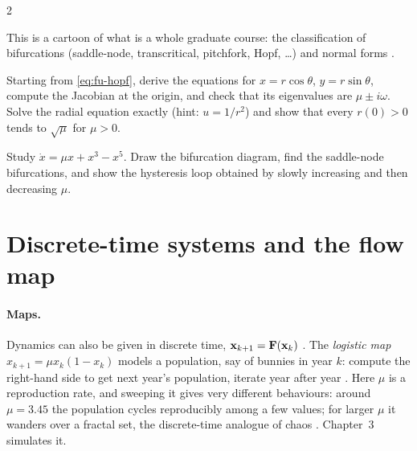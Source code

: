 \begin{paracol}{2}
\begin{remark}
This is a cartoon of what is a whole graduate course: the classification of bifurcations (saddle-node,
transcritical, pitchfork, Hopf, \dots) and normal forms .
\end{remark}

\begin{exercise}
Starting from \eqref{eq:fu-hopf}, derive the equations for $x=r\cos\theta$, $y=r\sin\theta$, compute
the Jacobian at the origin, and check that its eigenvalues are $\mu\pm i\omega$. Solve the radial
equation exactly (hint: $u=1/r^2$) and show that every $r(0)>0$ tends to $\sqrt\mu$ for $\mu>0$.
\end{exercise}

\begin{exercise}
Study $\dot x=\mu x+x^3-x^5$. Draw the bifurcation diagram, find the saddle-node bifurcations, and
show the hysteresis loop obtained by slowly increasing and then decreasing $\mu$.
\end{exercise}

\section{Discrete-time systems and the flow map}\label{sec:fu-discrete}

\paragraph{Maps.} Dynamics can also be given in discrete time, $\mathbf{x}_{k+1}=\mathbf{F}(\mathbf{x}_k)$
. The \emph{logistic map} $x_{k+1}=\mu x_k(1-x_k)$ models a population, say of bunnies
in year $k$: compute the right-hand side to get next year's population, iterate year after year
. Here $\mu$ is a reproduction rate, and sweeping it gives very different
behaviours: around $\mu=3.45$ the population cycles reproducibly among a few values; for larger $\mu$ it
wanders over a fractal set, the discrete-time analogue of chaos .
Chapter~3 simulates it.


\end{paracol}
